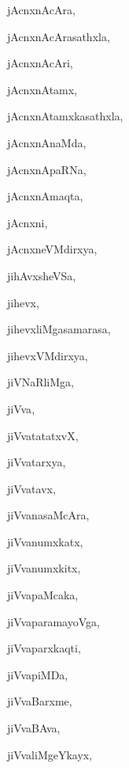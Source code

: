 \begin{multicols}{3}
{\noindent
{jAcnxnAcAra}, \pageref{jAcnxnAcAra}

\noindent
{jAcnxnAcArasathxla}, \pageref{jAcnxnAcArasathxla}

\noindent
{jAcnxnAcAri}, \pageref{jAcnxnAcAri}

\noindent
{jAcnxnAtamx}, \pageref{jAcnxnAtamx}

\noindent
{jAcnxnAtamxkasathxla}, \pageref{jAcnxnAtamxkasathxla}

\noindent
{jAcnxnAnaMda}, \pageref{jAcnxnAnaMda}

\noindent
{jAcnxnApaRNa}, \pageref{jAcnxnApaRNa}

\noindent
{jAcnxnAmaqta}, \pageref{jAcnxnAmaqta}

\noindent
{jAcnxni}, \pageref{jAcnxni}

\noindent
{jAcnxneVMdirxya}, \pageref{jAcnxneVMdirxya}

\noindent
{jihAvxsheVSa}, \pageref{jihAvxsheVSa}

\noindent
{jihevx}, \pageref{jihevx}

\noindent
{jihevxliMgasamarasa}, \pageref{jihevxliMgasamarasa}

\noindent
{jihevxVMdirxya}, \pageref{jihevxVMdirxya}

\noindent
{jiVNaRliMga}, \pageref{jiVNaRliMga}

\noindent
{jiVva}, \pageref{jiVva}

\noindent
{jiVvatatatxvX}, \pageref{jiVvatatatxvX}

\noindent
{jiVvatarxya}, \pageref{jiVvatarxya}

\noindent
{jiVvatavx}, \pageref{jiVvatavx}

\noindent
{jiVvanasaMcAra}, \pageref{jiVvanasaMcAra}

\noindent
{jiVvanumxkatx}, \pageref{jiVvanumxkatx}

\noindent
{jiVvanumxkitx}, \pageref{jiVvanumxkitx}

\noindent
{jiVvapaMcaka}, \pageref{jiVvapaMcaka}

\noindent
{jiVvaparamayoVga}, \pageref{jiVvaparamayoVga}

\noindent
{jiVvaparxkaqti}, \pageref{jiVvaparxkaqti}

\noindent
{jiVvapiMDa}, \pageref{jiVvapiMDa}

\noindent
{jiVvaBarxme}, \pageref{jiVvaBarxme}

\noindent
{jiVvaBAva}, \pageref{jiVvaBAva}

\noindent
{jiVvaliMgeYkayx}, \pageref{jiVvaliMgeYkayx}

}
\end{multicols}

